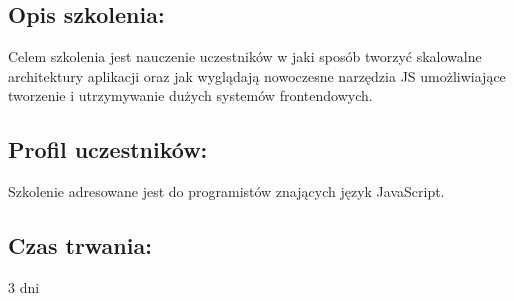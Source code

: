 \documentclass{article}[10pt]
\begin{document}
	\subsection*{Opis szkolenia:}
	\begin{adjustwidth}{2cm}{}
\justifying
		Celem szkolenia jest nauczenie uczestników w jaki sposób tworzyć skalowalne architektury aplikacji oraz jak wyglądają nowoczesne narzędzia JS umożliwiające tworzenie i utrzymywanie dużych systemów frontendowych.
	\end{adjustwidth}
	\subsection*{Profil uczestników:}
\begin{adjustwidth}{2cm}{}
\justifying
	
Szkolenie adresowane jest do programistów znających język JavaScript.
\end{adjustwidth}
	\subsection*{Czas trwania:}
\begin{adjustwidth}{2cm}{}
	3 dni
\end{adjustwidth}
\end{document}
